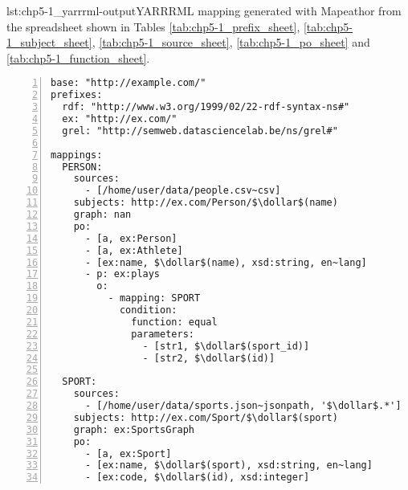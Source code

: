 \begin{captionedlisting}{lst:chp5-1_yarrrml-output}{YARRRML mapping generated with Mapeathor from the spreadsheet shown in Tables \ref{tab:chp5-1_prefix_sheet}, \ref{tab:chp5-1_subject_sheet}, \ref{tab:chp5-1_source_sheet}, \ref{tab:chp5-1_po_sheet} and \ref{tab:chp5-1_function_sheet}. }
\centering
{\begin{lstlisting}[numbers=left,basicstyle=\ttfamily\small,columns=flexible]
base: "http://example.com/"
prefixes:
  rdf: "http://www.w3.org/1999/02/22-rdf-syntax-ns#"
  ex: "http://ex.com/"
  grel: "http://semweb.datasciencelab.be/ns/grel#"

mappings:
  PERSON:
    sources:
      - [/home/user/data/people.csv~csv]
    subjects: http://ex.com/Person/$\dollar$(name)
    graph: nan
    po:
      - [a, ex:Person]
      - [a, ex:Athlete]
      - [ex:name, $\dollar$(name), xsd:string, en~lang]
      - p: ex:plays
        o:
          - mapping: SPORT
            condition:
              function: equal
              parameters:
                - [str1, $\dollar$(sport_id)]
                - [str2, $\dollar$(id)]
 
  SPORT:
    sources:
      - [/home/user/data/sports.json~jsonpath, '$\dollar$.*']
    subjects: http://ex.com/Sport/$\dollar$(sport)
    graph: ex:SportsGraph
    po:
      - [a, ex:Sport]
      - [ex:name, $\dollar$(sport), xsd:string, en~lang]
      - [ex:code, $\dollar$(id), xsd:integer]
\end{lstlisting}}
\end{captionedlisting}